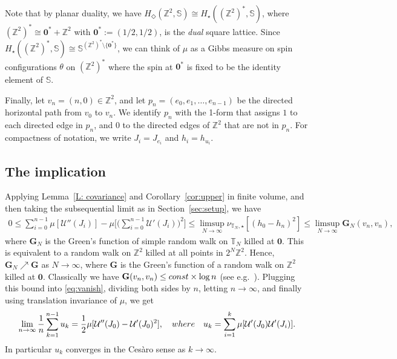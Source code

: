 \documentclass[11pt, reqno]{amsart}
\numberwithin{equation}{section}
\theoremstyle{definition}
\theoremstyle{remark}
\newcommand{\J}{J}
\newcommand{\exact}{\star}
\newcommand{\coclosed}{\Diamond}
\begin{document}
Note that by planar duality, we have $H_\coclosed(\mathbb Z^2, \mathbb S) \cong H_\exact((\mathbb Z^2)^*, \mathbb S) $,
where $(\mathbb Z^2)^* \cong \mathbf 0^*+\mathbb Z^2$ with $\mathbf 0^*:=(1/2,1/2)$, is the \emph{dual} square lattice. 
Since $ H_\exact((\mathbb Z^2)^*, \mathbb S) \cong {\mathbb S}^{(\mathbb Z^2)^*\setminus \{ \mathbf 0^* \}}$, we can think of $\mu$ as a Gibbs measure on spin configurations $\theta$ on $(\mathbb Z^2)^*$ where the spin at $\mathbf 0^*$ is fixed to be the identity element of $\mathbb S$. 

Finally, let $v_n=(n,0)\in \mathbb Z^2$, and
let $p_n=(e_0,e_1,\ldots,e_{n-1})$ be the directed horizontal path from $v_0$ to $v_{n}$. We identify $p_n$ with the 1-form that assigns $1$ to each directed edge in $p_n$, 
and $0$ to the directed edges of $\mathbb Z^2$ that are not in $p_n$. For compactness of notation, we write $\J_i=\J_{e_i}$ and $h_i=h_{u_i}$.

\subsection{The implication}

Applying Lemma~\ref{L: covariance} and Corollary~\ref{cor:upper} in finite volume, and then taking the subsequential limit as in Section~\ref{sec:setup}, we have 
\begin{align} \label{eq:vanish}
	0\leq \sum_{i=0}^{n-1}   \mu[\mathcal U''(\J_i)] - \mu \Big[\Big(\sum_{i=0}^{n-1}\mathcal U'(\J_i)\Big)^2\Big]\leq \limsup_{N\to \infty}  \nu_{\mathbb T_{N}, \exact}[(h_{0} -h_{n})^2]\leq \limsup_{N\to \infty} \mathbf G_{N}(v_n,v_n),
\end{align}
where $\mathbf G_{N}$ is the Green's function of simple random walk on $\mathbb T_N$ killed at $\mathbf 0$. This is equivalent to a random walk on $\mathbb Z^2$ killed at all points in $2^N\mathbb Z^2$. Hence, $\mathbf G_{N}\nearrow \mathbf G$ as $N\to \infty$, where $\mathbf G$ is the Green's function of a random walk on $\mathbb Z^2$ killed at $\mathbf 0$.
Classically we have $\mathbf G(v_n,v_n)\leq \textnormal{const}\times\log n$ (see e.g.~\cite{LyPer}). Plugging this bound into \eqref{eq:vanish}, dividing both sides by $n$,
letting $n\to \infty$, and finally using translation invariance of $\mu$, we get
\begin{align}\label{eq:cesaro}
	\lim_{n\to \infty}\frac{1}{n}\sum_{k=1}^{n-1} u_k=\frac12 \mu[\mathcal U''(\J_0)-\mathcal U'(\J_0)^2] , \quad  \textnormal{where} \quad u_k=\sum_{i=1}^k \mu [\mathcal U'(\J_0)\mathcal U'(\J_i)].
\end{align}
In particular $u_k$ converges in the Ces\`aro sense as $k\to \infty$. %
\end{document}
